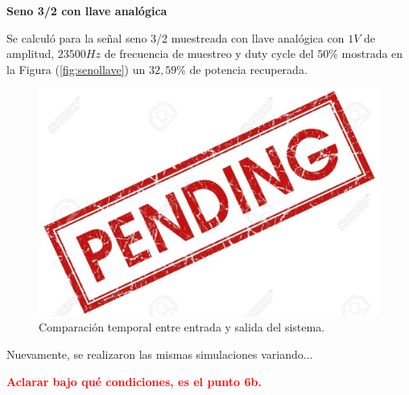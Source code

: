 \textbf{Seno 3/2 con llave analógica}

Se calculó para la señal seno 3/2 muestreada con llave analógica con $1V$ de amplitud, $23500Hz$ de frecuencia de muestreo y duty cycle del $50\%$ mostrada en la Figura (\ref{fig:senollave}) un $32,59\%$ de potencia recuperada. 

\begin{figure}[H]
\centering
\includegraphics[width=\textwidth]{ImagenesEjercicio6/pend.jpg}
\caption{Comparación temporal entre entrada y salida del sistema.}
\end{figure}

Nuevamente, se realizaron las mismas simulaciones variando...

\textcolor{red}{\textbf{Aclarar bajo qué condiciones, es el punto 6b.}}

